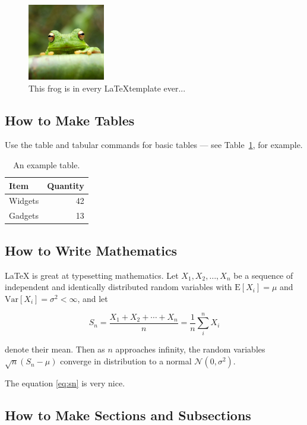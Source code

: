 \documentclass[]{article}%
\begin{document}
\begin{figure}[!ht]
\centering
\includegraphics[width=0.3\textwidth]{frog.jpg}
\caption{This frog is in every \LaTeX template ever...}
\label{fig:frog}
\end{figure}

\subsection{How to Make Tables}

Use the table and tabular commands for basic tables --- see Table~\ref{tab:widgets}, for example.

\begin{table}[!ht]
\centering
\begin{tabular}{l|r}
Item & Quantity \\\hline
Widgets & 42 \\
Gadgets & 13
\end{tabular}
\caption{An example table.}
\label{tab:widgets}
\end{table}

\subsection{How to Write Mathematics}

\LaTeX{} is great at typesetting mathematics. Let $X_1, X_2, \ldots, X_n$ be a sequence of independent and identically distributed random variables with $\text{E}[X_i] = \mu$ and $\text{Var}[X_i] = \sigma^2 < \infty$, and let

\begin{equation}
S_n = \frac{X_1 + X_2 + \cdots + X_n}{n}
      = \frac{1}{n}\sum_{i}^{n} X_i
\label{eq:sn}
\end{equation}

denote their mean. Then as $n$ approaches infinity, the random variables $\sqrt{n}(S_n - \mu)$ converge in distribution to a normal $\mathcal{N}(0, \sigma^2)$.

The equation \ref{eq:sn} is very nice.

\subsection{How to Make Sections and Subsections}
\end{document}
